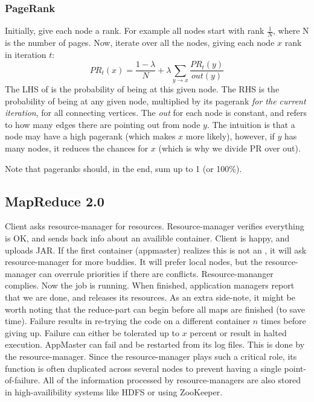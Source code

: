 \subsubsection{PageRank}
Initially, give each node a rank. For example all nodes start with rank $\frac{1}{N}$, where N is the number of pages.
Now, iterate over all the nodes, giving each node $x$ rank in iteration $t$:
\begin{equation}\label{eq:pagerank}
    PR_{t}(x) = \frac{1 - \lambda}{N} + \lambda\sum\limits_{{y \rightarrow x}{}}{\frac{PR_{t}(y)}{out(y)}}
\end{equation}
The LHS of  is the probability of being at this given node. The RHS is the probability of being at any given node, multiplied by its pagerank \textit{for the current iteration}, for all connecting vertices. The \textit{out} for each node is constant, and refers to how many edges there are pointing out from node $y$. The intuition is that a node may have a high pagerank (which makes $x$ more likely), however, if $y$ has many nodes, it reduces the chances for $x$ (which is why we divide PR over out).

Note that pageranks should, in the end, sum up to 1 (or 100\%). 


\subsection{MapReduce 2.0}
Client asks resource-manager for resources.
Resource-manager verifies everything is OK, and sends back info about an availible container. Client is happy, and uploads JAR.
If the first container (appmaster) realizes this is not an , it will ask resource-manager for more buddies. It will prefer local nodes, but the resource-manager can overrule priorities if there are conflicts. Resource-mananger complies.
Now the job is running. When finished, application managers report that we are done, 
and releases its resources. As an extra side-note, it might be worth noting that the
reduce-part can begin before all maps are finished (to save time).
Failure results in re-trying the code on a different container $n$ times before giving up. Failure can either be tolerated up to $x$ percent or result in halted execution.
AppMaster can fail and be restarted from its log files. This is done by the resource-manager. Since the resource-manager plays such a critical role, its function
is often duplicated across several nodes to prevent having a single point-of-failure.
All of the information processed by resource-managers are also stored in high-availibility systems like HDFS or using ZooKeeper.


